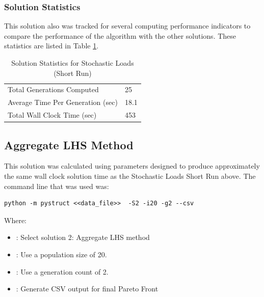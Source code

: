 \subsubsection{Solution Statistics}
This solution also was tracked for several computing performance indicators to compare the performance of the algorithm with the other solutions. These statistics are listed in Table \ref{tab:stat_sto_short}. 

\begin{table}[!htbp]
  \centering
  \begin{tabular}{|l|l|}
    \hline
	  Total Generations Computed & 25\\
    Average Time Per Generation (sec) & 18.1\\
    Total Wall Clock Time (sec)	 & 453\\
    \hline
  \end{tabular}
	\caption{Solution Statistics for Stochastic Loads (Short Run)}
  \label{tab:stat_sto_short}
\end{table}

\subsection{Aggregate LHS Method}
This solution was calculated using parameters designed to produce approximately the same wall clock solution time as the Stochastic Loads Short Run above. The command line that was used was:

\begin{verbatim}
python -m pystruct <<data_file>>  -S2 -i20 -g2 --csv
\end{verbatim}

\noindent Where: 

\begin{itemize}
  \item {}: Select solution 2: Aggregate LHS method
  \item {}: Use a population size of 20. 
  \item {}: Use a generation count of 2. 
  \item {}: Generate CSV output for final Pareto Front
\end{itemize}

